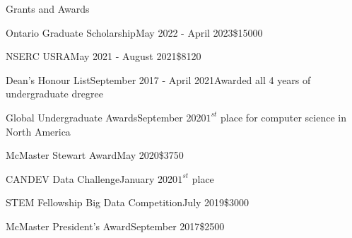\begin{rSection}{Grants and Awards} 

\begin{aSubsection}{Ontario Graduate Scholarship}{May 2022 - April 2023}{\$15000}{}
\end{aSubsection}

\begin{aSubsection}{NSERC USRA}{May 2021 - August 2021}{\$8120}{}
\end{aSubsection}

\begin{aSubsection}{Dean's Honour List}{September 2017 - April 2021}{Awarded all 4 years of undergraduate dregree}{}
\end{aSubsection}

\begin{aSubsection}{Global Undergraduate Awards}{September 2020}{$1^{st}$ place for computer science in North America}{}
\end{aSubsection}

\begin{aSubsection}{McMaster Stewart Award}{May 2020}{\$3750}{}
\end{aSubsection}

\begin{aSubsection}{CANDEV Data Challenge}{January 2020}{$1^{st}$ place}{}
\end{aSubsection}

\begin{aSubsection}{STEM Fellowship Big Data Competition}{July 2019}{\$3000}{}
\end{aSubsection}

\begin{aSubsection}{McMaster President's Award}{September 2017}{\$2500}{}
\end{aSubsection}

\end{rSection}

